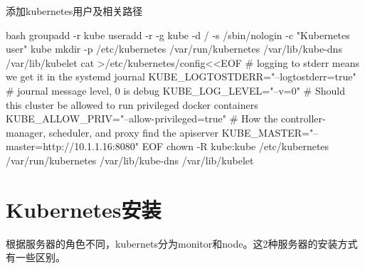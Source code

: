 \begin{outline}[enumerate]
  \1 添加kubernetes用户及相关路径
\begin{code-in-enumerate}{bash}
groupadd -r kube
useradd -r -g kube -d / -s /sbin/nologin -c "Kubernetes user" kube
mkdir -p /etc/kubernetes /var/run/kubernetes /var/lib/kube-dns /var/lib/kubelet
cat >/etc/kubernetes/config<<EOF
# logging to stderr means we get it in the systemd journal
KUBE_LOGTOSTDERR="--logtostderr=true"
# journal message level, 0 is debug
KUBE_LOG_LEVEL="--v=0"
# Should this cluster be allowed to run privileged docker containers
KUBE_ALLOW_PRIV="--allow-privileged=true"
# How the controller-manager, scheduler, and proxy find the apiserver
KUBE_MASTER="--master=http://10.1.1.16:8080"
EOF
chown -R kube:kube /etc/kubernetes /var/run/kubernetes /var/lib/kube-dns /var/lib/kubelet
\end{code-in-enumerate}

\end{outline}

\section{Kubernetes安装}
根据服务器的角色不同，kubernets分为monitor和node。这2种服务器的安装方式有一些区别。

